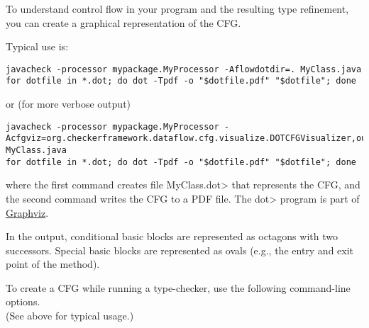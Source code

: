 
To understand control flow in your program and the resulting type
refinement, you can create a graphical representation of the CFG.

Typical use is:

\begin{Verbatim}
javacheck -processor mypackage.MyProcessor -Aflowdotdir=. MyClass.java
for dotfile in *.dot; do dot -Tpdf -o "$dotfile.pdf" "$dotfile"; done
\end{Verbatim}

\noindent
or (for more verbose output)

\begin{Verbatim}
javacheck -processor mypackage.MyProcessor -Acfgviz=org.checkerframework.dataflow.cfg.visualize.DOTCFGVisualizer,outdir=.,verbose MyClass.java
for dotfile in *.dot; do dot -Tpdf -o "$dotfile.pdf" "$dotfile"; done
\end{Verbatim}

\noindent
where the first command creates file \<MyClass.dot> that
represents the CFG, and the second command writes the CFG to a PDF file.
The \<dot> program is part of \href{http://www.graphviz.org}{Graphviz}.

In the output, conditional basic blocks are represented as octagons with
two successors.  Special basic blocks are represented as ovals (e.g., the
entry and exit point of the method).



To create a CFG while running a type-checker, use the following
command-line options. \\
(See above for typical usage.)

